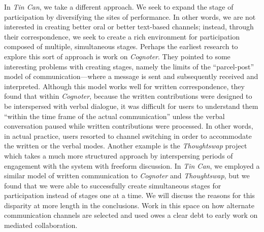 In \emph{Tin Can}, we take a different approach. We seek to expand the stage of participation by diversifying the sites of performance. In other words, we are not interested in creating better oral or better text-based channels; instead, through their correspondence, we seek to create a rich environment for participation composed of multiple, simultaneous stages.   Perhaps the earliest research to explore this sort of approach is  work on \emph{Cognoter}. They pointed to some interesting problems with creating stages, namely the limits of the ``parcel-post'' model of communication---where a message is sent and subsequently received and interpreted. Although this model works well for written correspondence, they found that within \emph{Cognoter}, because the written contributions were designed to be interspersed with verbal dialogue, it was difficult for users to understand them ``within the time frame of the actual communication'' unless the verbal conversation paused while written contributions were processed. In other words, in actual practice, users resorted to channel switching in order to accommodate the written or the verbal modes. Another example is the \emph{Thoughtswap} \citep{DickeyKurdziolek:2010wt} project which takes a much more structured approach by interspersing periods of engagement with the system with freeform discussion. In \emph{Tin Can}, we employed a similar model of written communication to \emph{Cognoter} and \emph{Thoughtswap}, but we found that we were able to successfully create simultaneous stages for participation instead of stages one at a time. We will discuss the reasons for this disparity at more length in the conclusions. Work in this space on how alternate communication channels are selected and used owes a clear debt to  early work on mediated collaboration.





